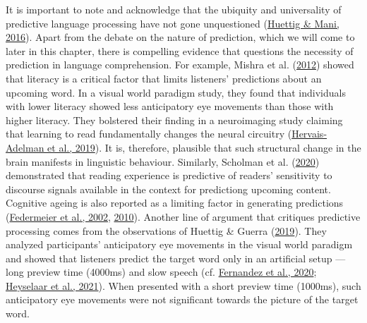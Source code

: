 \documentclass[a4paper, nobind]{templates/ociamthesis}
\begin{document}
It is important to note and acknowledge that the ubiquity and universality of predictive language processing have not gone unquestioned (\protect\hyperlink{ref-Huettig2016}{Huettig \& Mani, 2016}).
Apart from the debate on the nature of prediction, which we will come to later in this chapter, there is compelling evidence that questions the necessity of prediction in language comprehension.
For example, Mishra et al. (\protect\hyperlink{ref-Mishra2012}{2012}) showed that literacy is a critical factor that limits listeners' predictions about an upcoming word.
In a visual world paradigm study, they found that individuals with lower literacy showed less anticipatory eye movements than those with higher literacy.
They bolstered their finding in a neuroimaging study claiming that learning to read fundamentally changes the neural circuitry (\protect\hyperlink{ref-Hervais2019}{Hervais-Adelman et al., 2019}).
It is, therefore, plausible that such structural change in the brain manifests in linguistic behaviour.
Similarly, Scholman et al. (\protect\hyperlink{ref-Scholman2020}{2020}) demonstrated that reading experience is predictive of readers' sensitivity to discourse signals available in the context for predictiong upcoming content.
Cognitive ageing is also reported as a limiting factor in generating predictions (\protect\hyperlink{ref-Federmeier2002}{Federmeier et al., 2002}, \protect\hyperlink{ref-Federmeier2010}{2010}).
Another line of argument that critiques predictive processing comes from the observations of Huettig \& Guerra (\protect\hyperlink{ref-Huettig2019}{2019}).
They analyzed participants' anticipatory eye movements in the visual world paradigm and showed that listeners predict the target word only in an artificial setup --- long preview time (4000ms) and slow speech (cf. \protect\hyperlink{ref-Fernandez2020}{Fernandez et al., 2020}; \protect\hyperlink{ref-Heyselaar2021}{Heyselaar et al., 2021}).
When presented with a short preview time (1000ms), such anticipatory eye movements were not significant towards the picture of the target word.
\end{document}
